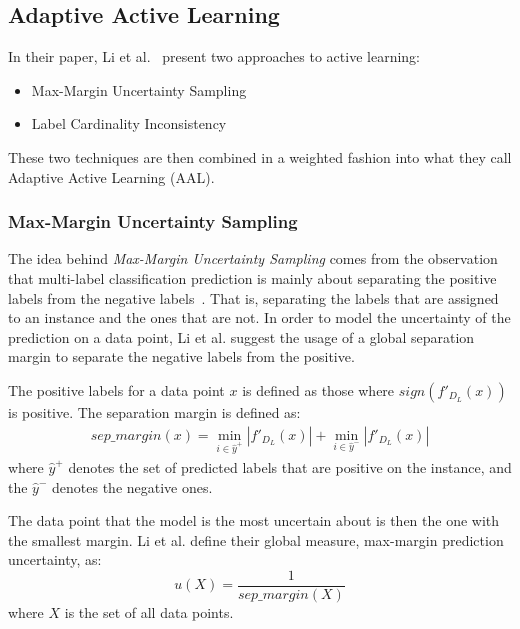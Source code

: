 \subsection{Adaptive Active Learning}\label{subsec:adaptive-active-learning}

In their paper, Li et al\@.~\cite{li2013active} present two approaches to active learning:
\begin{itemize}
    \item Max-Margin Uncertainty Sampling
    \item Label Cardinality Inconsistency 
\end{itemize}
These two techniques are then combined in a weighted fashion into what they call Adaptive Active Learning (AAL).

\subsubsection{Max-Margin Uncertainty Sampling}

The idea behind \textit{Max-Margin Uncertainty Sampling} comes from the observation that multi-label classification prediction is mainly about separating the positive labels from the negative labels~\cite{li2013active}.
That is, separating the labels that are assigned to an instance and the ones that are not.
In order to model the uncertainty of the prediction on a data point, Li et al\@. suggest the usage of a global separation margin to separate the negative labels from the positive.

The positive labels for a data point $x$ is defined as those where $sign(f'_{D_L}(x))$ is positive.
The separation margin is defined as:
\begin{equation}
    \begin{split}
        sep\_margin(x) = \min_{i \in \hat{y}^+}|f'_{D_L}(x)| + \min_{i \in \hat{y}^-}|f'_{D_L}(x)|
    \end{split}
\end{equation}
where $\hat{y}^+$ denotes the set of predicted labels that are positive on the instance, and the $\hat{y}^-$ denotes the negative ones.

The data point that the model is the most uncertain about is then the one with the smallest margin.
Li et al\@. define their global measure, max-margin prediction uncertainty, as:
\begin{equation}
    u(X) = \frac{1}{sep\_margin(X)}
\end{equation}
where $X$ is the set of all data points.

